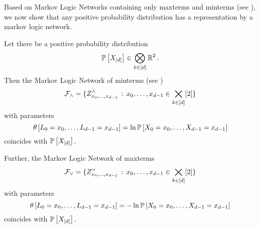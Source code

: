 \label{sec:MLNMaxMintermRep}

Based on Markov Logic Networks containing only maxterms and minterms (see ), we now show that any positive probability distribution has a representation by a markov logic network.

\begin{theorem}\label{the:maximalClausesRepresentation}\label{the:mintermExpressivityMLN}
	Let there be a positive probability distribution
		 \[ \mathbb{P}\left[X_{[d]}\right] \in \bigotimes_{k\in[d]}\mathbb{R}^2 \, . \]
	Then the Markov Logic Network of minterms (see )
		\[ \mathcal{F}_{\land} = \{Z^{\land}_{{x_{0},\ldots,x_{d-1}}} \, : \, {x_{0},\ldots,x_{d-1}}\in\bigtimes_{k\in[d]}[2] \}\]
	with parameters %
		\[ \canparamat{\selvariableof{0}=\catindexof{0},\ldots,\selvariableof{\atomorder-1}=\catindexof{\atomorder-1}}%
		= \ln \probat{\indexedcatvariables} \]
	coincides with $\mathbb{P}\left[X_{[d]}\right]$.

	Further, the Markov Logic Network of maxterms
		\[ \mathcal{F}_{\lor} = \{Z^{\lor}_{{x_{0},\ldots,x_{d-1}}} \, : \, {x_{0},\ldots,x_{d-1}}\in\bigtimes_{k\in[d]}[2] \}\]
	with parameters
		\[ \canparamat{\selvariableof{0}=\catindexof{0},\ldots,\selvariableof{\atomorder-1}=\catindexof{\atomorder-1}} %
		= - \ln\probat{\indexedcatvariables} \]
	coincides with $\mathbb{P}\left[X_{[d]}\right]$.
\end{theorem}

